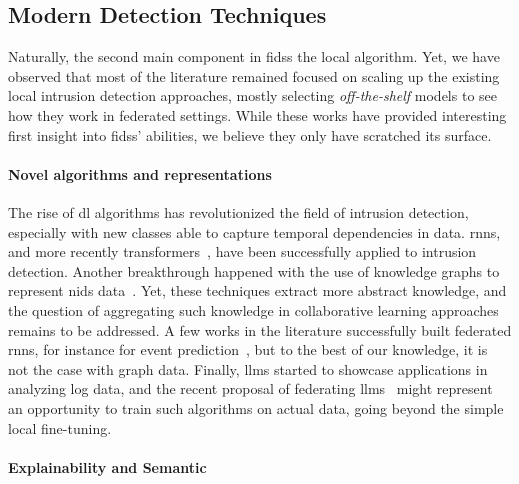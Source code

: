 \subsection{Modern Detection Techniques\label{sec:conclusion.perspectives.detection}}

Naturally, the second main component in \glspl{fids} the local algorithm.
Yet, we have observed that most of the literature remained focused on scaling up the existing local intrusion detection approaches, mostly selecting \emph{off-the-shelf} models to see how they work in federated settings.
While these works have provided interesting first insight into \glspl{fids}' abilities, we believe they only have scratched its surface.

\paragraph{Novel algorithms and representations}
The rise of \gls{dl} algorithms has revolutionized the field of intrusion detection, especially with new classes able to capture temporal dependencies in data.
\Glspl{rnn}, and more recently transformers~\cite{wu_RTIDSRobustTransformerBased_2022}, have been successfully applied to intrusion detection.
Another breakthrough happened with the use of knowledge graphs to represent \gls{nids} data~\cite{leichtnam_Sec2graphNetworkAttack_2020}.
Yet, these techniques extract more abstract knowledge, and the question of aggregating such knowledge in collaborative learning approaches remains to be addressed.
A few works in the literature successfully built federated \glspl{rnn}, for instance for event prediction~\cite{naseri_CerberusExploringFederated_2022}, but to the best of our knowledge, it is not the case with graph data.
Finally, \glspl{llm} started to showcase applications in analyzing log data, and the recent proposal of federating \glspl{llm}~\cite{wu_RTIDSRobustTransformerBased_2022} might represent an opportunity to train such algorithms on actual data, going beyond the simple local fine-tuning.


\paragraph{Explainability and Semantic}

